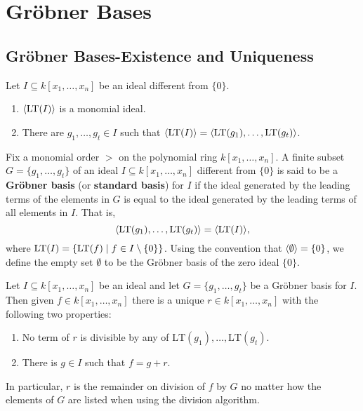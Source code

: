 \chapter{Gr{\"o}bner Bases} 

\section{Gr{\"o}bner Bases-Existence and Uniqueness}

\begin{theorem} %
    \label{thm:initialIdeal_is_FG}
    Let $I \subseteq k[x_1, \ldots , x_n]$ be an ideal different from $\{ 0 \}$.
    \begin{enumerate}
        \item $\langle\operatorname{LT}(I)\rangle$ is a monomial ideal.
        \item There are $g_1, \ldots , g_t \in I$ such that $\langle \operatorname{LT}(I)\rangle = \langle \operatorname{LT}(g_1), \ldots , \operatorname{LT}(g_t)\rangle$.
    \end{enumerate}
\end{theorem}

\begin{definition}\label{def:Groebner_basis}
    Fix a monomial order $>$ on the polynomial ring $k[x_1, \dots, x_n]$. 
    A finite subset $G = \{g_1, \dots, g_t\}$ of an ideal $I \subseteq k[x_1, \dots, x_n]$ different from $\{0\}$ 
    is said to be a \textbf{Gr{\"o}bner basis} (or \textbf{standard basis}) for $I$ if the ideal generated by the
    leading terms of the elements in $G$ is equal to the ideal generated by the leading terms of all elements in $I$.
    That is,
    \[ \langle \operatorname{LT}(g_1), \dots, \operatorname{LT}(g_t) \rangle = \langle \operatorname{LT}(I) \rangle, \]
    where $\operatorname{LT}(I) = \{\operatorname{LT}(f) \mid f \in I \setminus \{0\}\}$.
    Using the convention that $\langle \emptyset \rangle = \{0\}$, we define the empty set $\emptyset$
    to be the Gr{\"o}bner basis of the zero ideal $\{0\}$.
\end{definition}

\begin{proposition}\label{prop:GR_Unique_Remainder} %
    Let $I \subseteq k[x_1,\dots,x_n]$ be an ideal and let $G = \{g_1,\dots,g_t\}$ be a Gr{\"o}bner basis for $I$.  
    Then given $f \in k[x_1,\dots,x_n]$ there is a unique $r \in k[x_1,\dots,x_n]$ with the following two properties:
    \begin{enumerate}
    \item No term of $r$ is divisible by any of 
      \(\mathrm{LT}(g_1),\dots,\mathrm{LT}(g_t)\).
    \item There is $g\in I$ such that $f = g + r$.
    \end{enumerate}
    In particular, $r$ is the remainder on division of $f$ by $G$ no matter how the elements of $G$ are listed when using the division algorithm.
\end{proposition}

